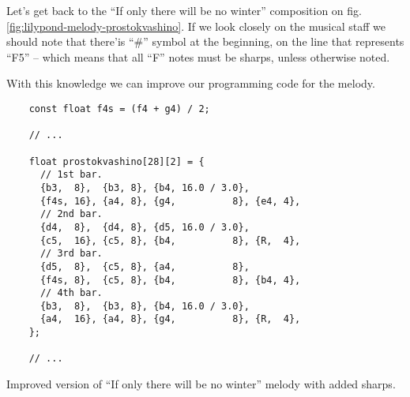 \documentclass[../sparc.tex]{subfiles}
\begin{document}
Let's get back to the ``If only there will be no winter'' composition on
fig. \ref{fig:lilypond-melody-prostokvashino}.  If we look closely on the
musical staff we should note that there'is ``\#'' symbol at the beginning, on
the line that represents ``F5'' -- which means that all ``F'' notes must be
sharps, unless otherwise noted.

\begin{figure}[H]
\end{figure}

With this knowledge we can improve our programming code for the melody.

\begin{listing}[H]
  \begin{verbatim}
    const float f4s = (f4 + g4) / 2;

    // ...

    float prostokvashino[28][2] = {
      // 1st bar.
      {b3,  8},  {b3, 8}, {b4, 16.0 / 3.0},
      {f4s, 16}, {a4, 8}, {g4,          8}, {e4, 4},
      // 2nd bar.
      {d4,  8},  {d4, 8}, {d5, 16.0 / 3.0},
      {c5,  16}, {c5, 8}, {b4,          8}, {R,  4},
      // 3rd bar.
      {d5,  8},  {c5, 8}, {a4,          8},
      {f4s, 8},  {c5, 8}, {b4,          8}, {b4, 4},
      // 4th bar.
      {b3,  8},  {b3, 8}, {b4, 16.0 / 3.0},
      {a4,  16}, {a4, 8}, {g4,          8}, {R,  4},
    };

    // ...
  \end{verbatim}
  \label{listing:prostokvashino-with-shaprs}
  \caption{Improved version of ``If only there will be no winter'' melody with
    added sharps.}
\end{listing}
\end{document}
